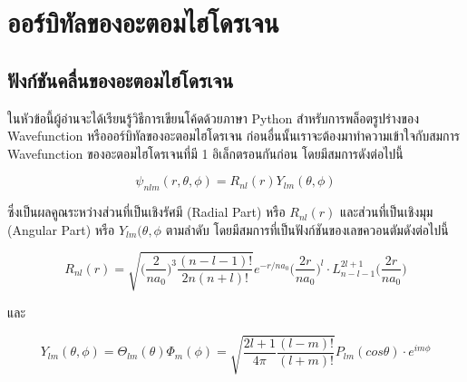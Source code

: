 

\chapter{ออร์บิทัลของอะตอมไฮโดรเจน}
\label{ch:hydro_orbitals}

\section{ฟังก์ชันคลื่นของอะตอมไฮโดรเจน}
\label{sec:hydro_wfn}

ในหัวข้อนี้ผู้อ่านจะได้เรียนรู้วิธีการเขียนโค้ดด้วยภาษา Python สำหรับการพล็อตรูปร่างของ Wavefunction หรือออร์บิทัลของอะตอมไฮโดรเจน ก่อนอื่นนั้นเราจะต้องมาทำความเข้าใจกับสมการ Wavefunction ของอะตอมไฮโดรเจนที่มี 1 อิเล็กตรอนกันก่อน โดยมีสมการดังต่อไปนี้

\begin{equation}\label{eq:hydro_wfn}
    \psi_{nlm}(r,\theta,\phi) = R_{nl}(r) Y_{lm}(\theta,\phi)
\end{equation}

\noindent ซึ่งเป็นผลคูณระหว่างส่วนที่เป็นเชิงรัศมี (Radial Part) หรือ $R_{nl}(r)$ และส่วนที่เป็นเชิงมุม (Angular Part) หรือ $Y_{lm}(\theta, \phi$ ตามลำดับ โดยมีสมการที่เป็นฟังก์ชันของเลขควอนตัมดังต่อไปนี้

\begin{equation}\label{eq:hydro_wfn_rad}
    R_{nl}(r) = \sqrt{\Big(\frac{2}{n a_0}\Big)^3 \frac{(n-l-1)!}{2n (n+l)!}} e^{-r/n a_0} 
        \Big( \frac{2r}{na_0}\Big)^l  \cdot L^{2l+1}_{n-l-1} \Big(\frac{2r}{n a_0} \Big)
\end{equation}

\noindent และ

\begin{equation}\label{eq:hydro_wfn_ang}
    Y_{lm}(\theta,\phi) = \Theta_{lm}(\theta) \Phi_m (\phi) 
        = \sqrt{\frac{2l+1}{4\pi} \frac{(l-m)!}{(l+m)!} } 
        P_{lm}(cos \theta) \cdot e^{im\phi}
\end{equation}

